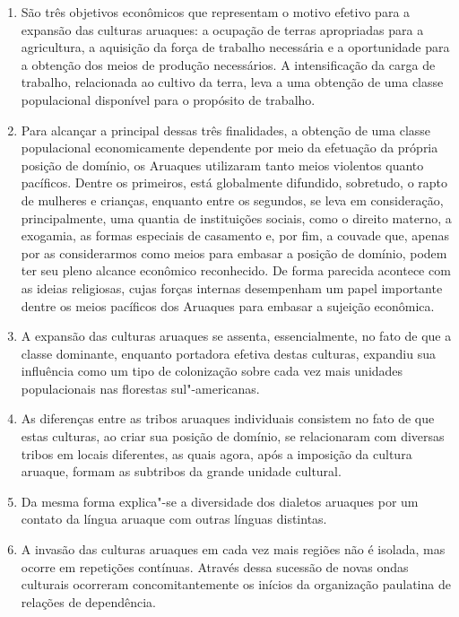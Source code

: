 \begin{enumerate}
\def\labelenumi{\arabic{enumi}.}
\setcounter{enumi}{4}
\item
  São três objetivos econômicos que representam o motivo efetivo para a
  expansão das culturas aruaques: a ocupação de terras apropriadas para a
  agricultura, a aquisição da força de trabalho necessária e a
  oportunidade para a obtenção dos meios de produção necessários. A
  intensificação da carga de trabalho, relacionada ao cultivo da
  terra, leva a uma obtenção de uma classe populacional disponível para
  o propósito de trabalho.
\item
  Para alcançar a principal dessas três finalidades, a obtenção de uma
  classe populacional economicamente dependente por meio da efetuação da
  própria posição de domínio, os Aruaques utilizaram tanto meios
  violentos quanto pacíficos. Dentre os primeiros, está
  globalmente difundido, sobretudo, o rapto de mulheres e crianças,
  enquanto entre os segundos, se leva em consideração,
  principalmente, uma quantia de instituições sociais, como o direito
  materno, a exogamia, as formas especiais de casamento e, por fim, a
  couvade que, apenas por as considerarmos como meios para embasar a
  posição de domínio, podem ter seu pleno alcance econômico reconhecido.
  De forma parecida acontece com as ideias religiosas, cujas forças
  internas desempenham um papel importante dentre os meios pacíficos
  dos Aruaques para embasar a sujeição econômica.
\item
  A expansão das culturas aruaques se assenta, essencialmente, no fato de
  que a classe dominante, enquanto portadora efetiva destas culturas,
  expandiu sua influência como um tipo de colonização sobre cada vez
  mais unidades populacionais nas florestas sul"-americanas.
\item
  As diferenças entre as tribos aruaques individuais consistem no fato de
  que estas culturas, ao criar sua posição de domínio, se
  relacionaram com diversas tribos em locais diferentes, as quais
  agora, após a imposição da cultura aruaque, formam as subtribos da grande unidade cultural.
\item
  Da mesma forma explica"-se a diversidade dos dialetos aruaques por um
  contato da língua aruaque com outras línguas distintas.
\item
  A invasão das culturas aruaques em cada vez mais regiões não é isolada,
  mas ocorre em repetições contínuas. Através dessa sucessão de novas
  ondas culturais ocorreram concomitantemente os inícios da organização
  paulatina de relações de dependência.

\end{enumerate}

